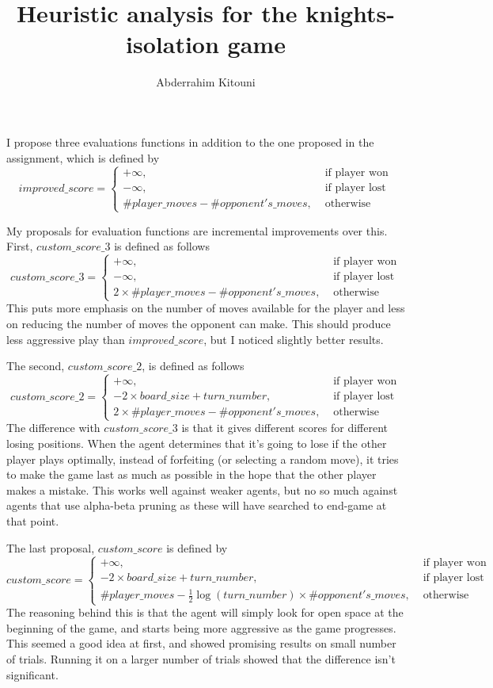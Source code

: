 \documentclass[11pt]{article}
\title{Heuristic analysis for the knights-isolation game}
\author{Abderrahim Kitouni}
\begin{document}
\maketitle

I propose three evaluations functions in addition to the one proposed in the assignment, which is defined by
\[
  improved\_score =
  \begin{cases}
    +\infty, & \text{ if player won} \\
    -\infty, & \text{ if player lost} \\
    \#player\_moves - \#opponent's\_moves, & \text{ otherwise}
  \end{cases}
\]

My proposals for evaluation functions are incremental improvements over this. First, $custom\_score\_3$ is defined as follows
\[
  custom\_score\_3 =
  \begin{cases}
    +\infty, & \text{ if player won} \\
    -\infty, & \text{ if player lost} \\
    2 \times \#player\_moves - \#opponent's\_moves, & \text{ otherwise}
  \end{cases}
\]
This puts more emphasis on the number of moves available for the player and less on reducing the number of moves the opponent can make. This should produce less aggressive play than $improved\_score$, but I noticed slightly better results.

The second, $custom\_score\_2$, is defined as follows
\[
  custom\_score\_2 =
  \begin{cases}
    +\infty, & \text{ if player won} \\
    - 2 \times board\_size + turn\_number, & \text{ if player lost} \\
    2 \times \#player\_moves - \#opponent's\_moves, & \text{ otherwise}
  \end{cases}
\]
The difference with $custom\_score\_3$ is that it gives different scores for different losing positions. When the agent determines that it's going to lose if the other player plays optimally, instead of forfeiting (or selecting a random move), it tries to make the game last as much as possible in the hope that the other player makes a mistake. This works well against weaker agents, but no so much against agents that use alpha-beta pruning as these will have searched to end-game at that point.

The last proposal, $custom\_score$ is defined by
\[
  custom\_score =
  \begin{cases}
    +\infty, & \text{ if player won} \\
    - 2 \times board\_size + turn\_number, & \text{ if player lost} \\
    \#player\_moves - \frac{1}{2} \log(turn\_number) \times \#opponent's\_moves, & \text{ otherwise}
  \end{cases}
\]
The reasoning behind this is that the agent will simply look for open space at the beginning of the game, and starts being more aggressive as the game progresses. This seemed a good idea at first, and showed promising results on small number of trials. Running it on a larger number of trials showed that the difference isn't significant.
\end{document}
